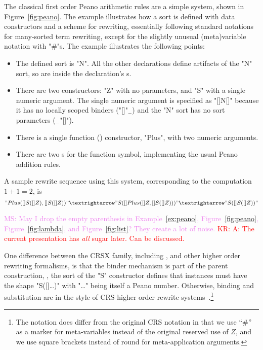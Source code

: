 \documentclass[letterpaper,11pt]{article}
\newcommand{\KR}[1]{\textcolor{red}{KR: #1}}
\newcommand{\MS}[1]{\textcolor{violet}{MS: #1}}
\begin{document}
\begin{example}[Peano]\label{ex:peano}
  The classical first order Peano arithmetic rules are a simple \hax system, shown in
  Figure~\ref{fig:peano}.  The example illustrates how a sort is defined with data constructors and
  a scheme for rewriting, essentially following standard notations for many-sorted term rewriting,
  except for the slightly unusual (meta)variable notation with "#"s. The example illustrates the
  following points:
  \begin{itemize}

  \item The defined sort is "N". All the other declarations define artifacts of the "N" sort, so are
    inside the  declaration's \kw{\{\}}s.

  \item There are two  constructors: "Z" with no parameters, and "S" with a single numeric
    argument. The single numeric argument is specified as "[]N[]" because it has no locally scoped
    binders ("[]"$_-$) and the "N" sort has no sort parameters ($_-$"[]").

  \item There is a single function () constructor, "Plus", with two numeric arguments.

  \item There are two s for the function symbol, implementing the usual Peano addition rules.

  \end{itemize}
  A sample rewrite sequence using this system, corresponding to the computation $1+1=2$, is
  \begin{displaymath}
    "Plus([]S([]Z), []S([]Z))" →
    "S([]Plus([]Z, []S([]Z)))" →
    "S([]S([]Z))"
  \end{displaymath}
\end{example}
\MS{May I drop the empty parenthesis in Example~\ref{ex:peano}, Figure~\ref{fig:peano},
  Figure~\ref{fig:lambda}, and Figure~\ref{fig:list}? They create a lot of noise.}
\KR{A: The current presentation has \emph{all} sugar later. Can be discussed.} 

\begin{remark}
  One difference between the CRSX family, including \hax, and other higher order rewriting
  formalisms, is that the binder mechanism is part of the parent construction, \eg, the sort of the
  "S" constructor defines that instances must have the shape "S([]…)" with "…" being itself a Peano
  number.  Otherwise, binding and substitution are in the style of CRS higher order rewrite
  systems~\cite{Klop+:tcs1993}.\footnote{The notation does differ from the original CRS notation in
    that we use ``\#'' as a marker for meta-variables instead of the original reserved use of $Z$,
    and we use square brackets instead of round for meta-application arguments.}
\end{remark}
\end{document}
